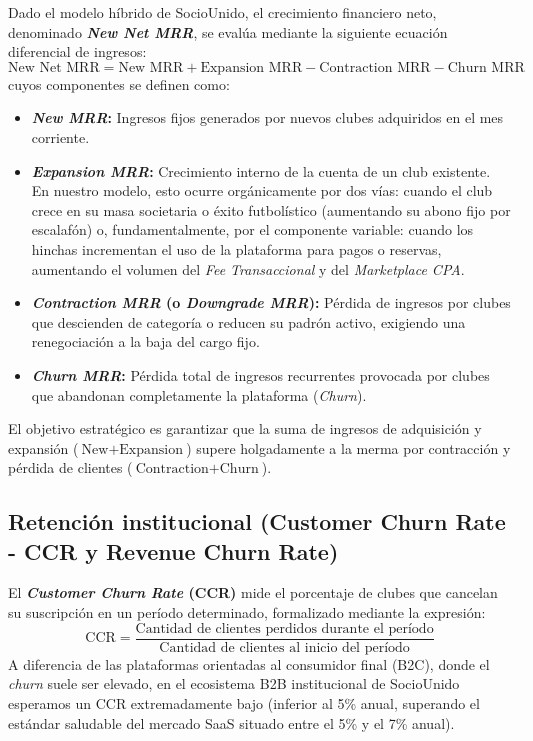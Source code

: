Dado el modelo híbrido de SocioUnido, el crecimiento financiero neto, denominado \textbf{\textit{New Net MRR}}, se evalúa mediante la siguiente ecuación diferencial de ingresos:
\begin{equation}
    \text{New Net MRR} = \text{New MRR} + \text{Expansion MRR} - \text{Contraction MRR} - \text{Churn MRR}
\end{equation}
cuyos componentes se definen como:
\begin{itemize}
    \item \textbf{\textit{New MRR}:} Ingresos fijos generados por nuevos clubes adquiridos en el mes corriente.
    \item \textbf{\textit{Expansion MRR}:} Crecimiento interno de la cuenta de un club existente. En nuestro modelo, esto ocurre orgánicamente por dos vías: cuando el club crece en su masa societaria o éxito futbolístico (aumentando su abono fijo por escalafón) o, fundamentalmente, por el componente variable: cuando los hinchas incrementan el uso de la plataforma para pagos o reservas, aumentando el volumen del \textit{Fee Transaccional} y del \textit{Marketplace CPA}.
    \item \textbf{\textit{Contraction MRR} (o \textit{Downgrade MRR}):} Pérdida de ingresos por clubes que descienden de categoría o reducen su padrón activo, exigiendo una renegociación a la baja del cargo fijo.
    \item \textbf{\textit{Churn MRR}:} Pérdida total de ingresos recurrentes provocada por clubes que abandonan completamente la plataforma (\textit{Churn}).
\end{itemize}
El objetivo estratégico es garantizar que la suma de ingresos de adquisición y expansión ($\text{New} + \text{Expansion}$) supere holgadamente a la merma por contracción y pérdida de clientes ($\text{Contraction} + \text{Churn}$).

\subsection{Retención institucional (Customer Churn Rate - CCR y Revenue Churn Rate)}

El \textbf{\textit{Customer Churn Rate} (CCR)} mide el porcentaje de clubes que cancelan su suscripción en un período determinado, formalizado mediante la expresión:
\begin{equation}
    \text{CCR} = \frac{\text{Cantidad de clientes perdidos durante el período}}{\text{Cantidad de clientes al inicio del período}}
\end{equation}
A diferencia de las plataformas orientadas al consumidor final (B2C), donde el \textit{churn} suele ser elevado, en el ecosistema B2B institucional de SocioUnido esperamos un CCR extremadamente bajo (inferior al 5\% anual, superando el estándar saludable del mercado SaaS situado entre el 5\% y el 7\% anual).

